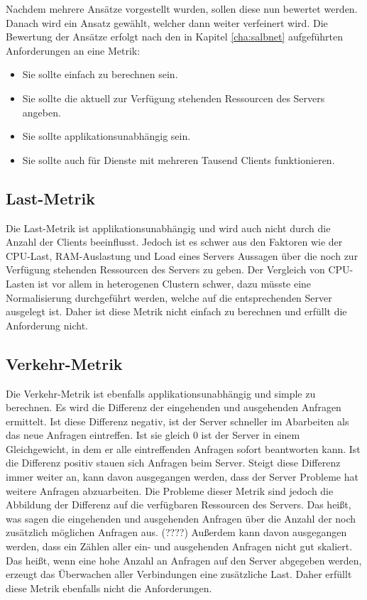 \documentclass[a4paper, 12pt, BCOR10mm, DIV12, toc=bibliography, toc=listof, german]{scrbook}
\begin{document}
		Nachdem mehrere Ansätze vorgestellt wurden, sollen diese nun bewertet werden. Danach wird ein
		Ansatz gewählt, welcher dann weiter verfeinert wird. Die Bewertung der Ansätze erfolgt nach den
		in Kapitel \ref{cha:salbnet} aufgeführten Anforderungen an eine Metrik:

		\begin{itemize}
			\item Sie sollte einfach zu berechnen sein.
			\item Sie sollte die aktuell zur Verfügung stehenden Ressourcen des Servers angeben.
			\item Sie sollte applikationsunabhängig sein.
			\item Sie sollte auch für Dienste mit mehreren Tausend Clients funktionieren.
		\end{itemize}

		\subsection*{Last-Metrik} %

		Die Last-Metrik ist applikationsunabhängig und wird auch nicht durch die Anzahl der Clients
		beeinflusst. Jedoch ist es schwer aus den Faktoren wie der CPU-Last, RAM-Auslastung und Load
		eines Servers Aussagen über die noch zur Verfügung stehenden Ressourcen des Servers zu geben.
		Der Vergleich von CPU-Lasten ist vor allem in heterogenen Clustern schwer, dazu müsste eine
		Normalisierung durchgeführt werden, welche auf die entsprechenden Server ausgelegt ist. Daher
		ist diese Metrik nicht einfach zu berechnen und erfüllt die Anforderung nicht.
		
	
		\subsection*{Verkehr-Metrik} %

		Die Verkehr-Metrik ist ebenfalls applikationsunabhängig und simple zu berechnen. Es wird die
		Differenz der eingehenden und ausgehenden Anfragen ermittelt. Ist diese Differenz negativ, ist
		der Server schneller im Abarbeiten als das neue Anfragen eintreffen. Ist sie gleich 0 ist der
		Server in einem Gleichgewicht, in dem er alle eintreffenden Anfragen sofort beantworten kann.
		Ist die Differenz positiv stauen sich Anfragen beim Server. Steigt diese Differenz immer
		weiter an, kann davon ausgegangen werden, dass der Server Probleme hat weitere Anfragen
		abzuarbeiten. Die Probleme dieser Metrik sind jedoch die Abbildung der Differenz auf die
		verfügbaren Ressourcen des Servers. Das heißt, was sagen die eingehenden und ausgehenden Anfragen
		über die Anzahl der noch zusätzlich möglichen Anfragen aus. (????) Außerdem kann davon ausgegangen
		werden, dass ein Zählen aller ein- und ausgehenden Anfragen nicht gut skaliert. Das heißt, wenn
		eine hohe Anzahl an Anfragen auf den Server abgegeben werden, erzeugt das Überwachen aller
		Verbindungen eine zusätzliche Last. Daher erfüllt diese Metrik ebenfalls nicht die
		Anforderungen.
		
\end{document}

